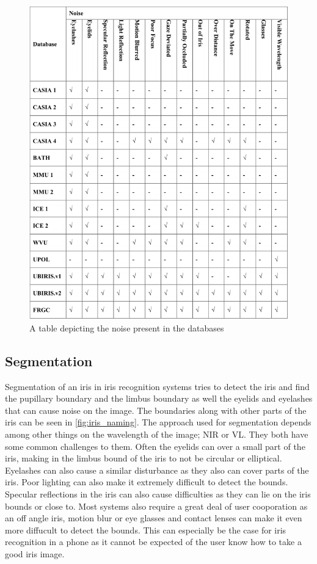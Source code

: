 \begin{figure}[h]
\centering
\includegraphics[width=\textwidth]{figures/Iris_Database_tabel_2.png} 
\caption{A table depicting the noise present in the databases}
\label{fig:Iris_database_2}
\end{figure}


\subsection{Segmentation}
Segmentation of an iris in iris recognition systems tries to detect the iris and find the pupillary boundary and the limbus boundary as well the eyelids and eyelashes that can cause noise on the image. The boundaries along with other parts of the iris can be seen in \autoref{fig:iris_naming}. The approach used for segmentation depends among other things  on the wavelength of the image; NIR or VL. They both have some common challenges to them. Often the eyelids can over a small part of the iris, making in the limbus bound of the iris to not be circular or elliptical. Eyelashes can also cause a similar disturbance as they also can cover parts of the iris. Poor lighting can also make it extremely difficult to detect the bounds. Specular reflections in the iris can also cause difficulties as they can lie on the iris bounds or close to. Most systems also require a great deal of user cooporation as an off angle iris, motion blur or eye glasses and contact lenses can make it even more diffucult to detect the bounds. This can especially be the case for iris recognition in a phone as it cannot be expected of the user know how to take a good iris image. 

